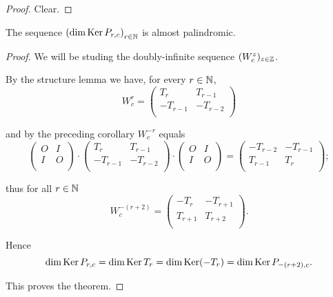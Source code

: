 \begin{proof}
  Clear.
\end{proof}

\begin{theorem}
  The sequence $\left(\dim\operatorname{Ker} P_{r,c}\right)_{r\in\mathbb{N}}$
  is almost palindromic.
\end{theorem}

\begin{proof}
  We will be studing the doubly-infinite sequence
  $(W_{c}^{z})_{z\in\mathbb{Z}}$.

  By the structure lemma we have, for every $r\in\mathbb{N}$,
  \[
  W_{c}^{r}
  =
  \left(
  \begin{array}{cc}
     T_{r} &  T_{r-1}  \\
    -T_{r-1} & -T_{r-2} \\
  \end{array}
  \right)
  \]

  and by the preceding corollary $W_{c}^{-r}$ equals
  \[
  \left(
  \begin{array}{cc}
    O & I \\
    I & O \\
  \end{array}
  \right)
  \cdot
  \left(
  \begin{array}{cc}
     T_{r} &  T_{r-1}  \\
    -T_{r-1} & -T_{r-2} \\
  \end{array}
  \right)
  \cdot
  \left(
  \begin{array}{cc}
    O & I \\
    I & O \\
  \end{array}
  \right)
  =
  \left(
  \begin{array}{cc}
    -T_{r-2}  & -T_{r-1} \\
     T_{r-1} & T_{r}     \\
  \end{array}
  \right);
  \]

  thus for all $r\in\mathbb{N}$
  \[
  W_{c}^{-(r+2)}
  =
  \left(
  \begin{array}{cc}
    -T_{r}  & -T_{r+1} \\
     T_{r+1} & T_{r+2} \\
  \end{array}
  \right).
  \]

  Hence
  \[
  \dim\operatorname{Ker} P_{r,c} =
  \dim\operatorname{Ker} T_{r} =
  \dim\operatorname{Ker}(-T_{r}) =
  \dim\operatorname{Ker} P_{-(r+2),c}.
  \]

  This proves the theorem.
\end{proof}
